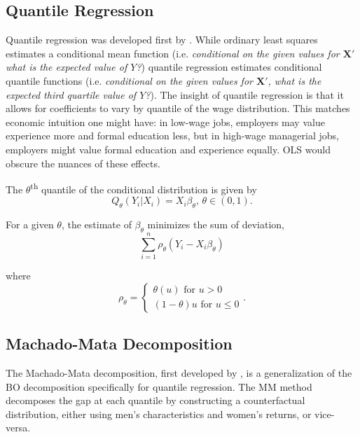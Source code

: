 \documentclass[12pt]{article}
\begin{document}
\subsection{Quantile Regression
\label{subsec:quantile-regression}}
Quantile regression was developed first by \citet{KoenkerandBassett1978}. While ordinary least squares estimates a conditional mean function (i.e.\textit{ conditional on the given values for $\mathbf{X'}$ what is the expected value of $Y$?}) quantile regression estimates conditional quantile functions (i.e.\textit{ conditional on the given values for $\mathbf{X'}$, what is the expected third quartile value of $Y$?}). The insight of quantile regression is that it allows for coefficients to vary by quantile of the wage distribution. This matches economic intuition one might have: in low-wage jobs, employers may value experience more and formal education less, but in high-wage managerial jobs, employers might value formal education and experience equally. OLS would obscure the nuances of these effects.

The $\theta$\textsuperscript{th} quantile of the conditional distribution is given by
\begin{equation}
	Q_{\theta}\left(Y_i|X_i \right) = X_{i}\beta_{\theta}, \, \theta \in (0, 1)
.\end{equation}

For a given $\theta$, the estimate of $\beta_{\theta}$ minimizes the sum of deviation,
\begin{equation}
	\sum_{i=1}^{n} \rho_{\theta} \left( Y_{i} - X_{i} \beta_{\theta} \right) 
\end{equation}

where
\begin{equation}
	\rho_{\theta} = \begin{cases}
		\theta\left(u \right)  \text{ for } u > 0 \\
		\left( 1-\theta \right) u \text{ for } u \leq 0
	\end{cases}
.\end{equation}


\subsection{Machado-Mata Decomposition
\label{subsec:m-m-decomposition}}

The Machado-Mata decomposition, first developed by \citet{MachadoMata2005}, is a generalization of the BO decomposition specifically for quantile regression. The MM method decomposes the gap at each quantile by constructing a counterfactual distribution, either using men's characteristics and women's returns, or vice-versa.
\end{document}
